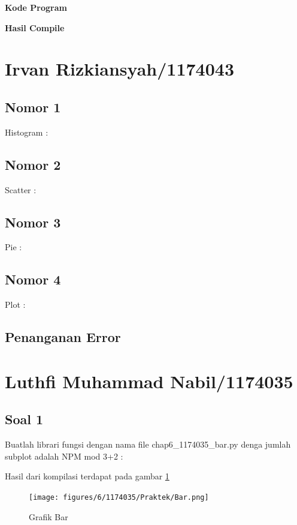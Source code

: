 \hfill \break
\textbf{Kode Program}



\hfill \break
\textbf{Hasil Compile}

\section{Irvan Rizkiansyah/1174043}
	\subsection{Nomor 1}
	Histogram :
		
	\subsection{Nomor 2}
	Scatter :
		
	\subsection{Nomor 3}
	Pie :
		
	\subsection{Nomor 4}
	Plot :
		
	\subsection{Penanganan Error}
		

\section{Luthfi Muhammad Nabil/1174035}
	\subsection{Soal 1}
	Buatlah librari fungsi dengan nama file chap6\_1174035\_bar.py denga jumlah subplot adalah NPM mod 3+2 : 

	
	
	Hasil dari kompilasi terdapat pada gambar \ref{1174035_Bar}
	\begin{figure}[ht]
		\centerline{\texttt{[image: figures/6/1174035/Praktek/Bar.png]}}
		\caption{Grafik Bar}
		\label{1174035_Bar}
	\end{figure}
